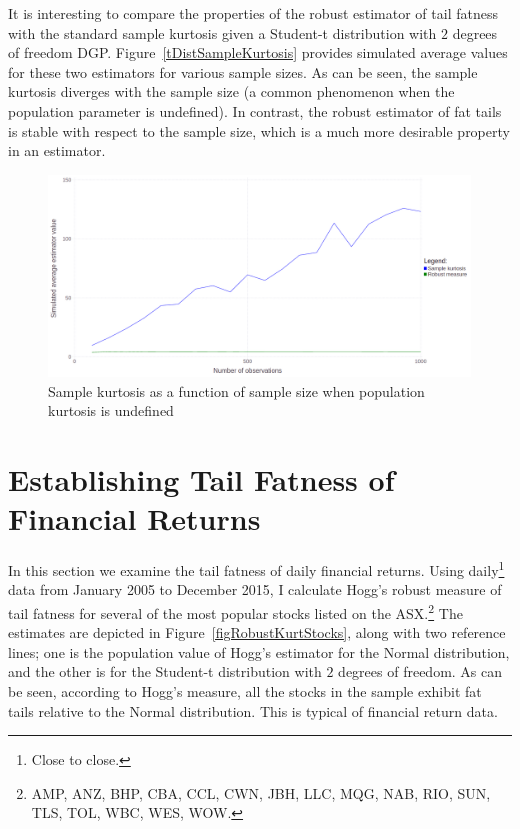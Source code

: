 \documentclass[12pt,a4paper]{amsart}
\begin{document}
It is interesting to compare the properties of the robust estimator of tail fatness with the standard sample kurtosis given a Student-t distribution with $2$ degrees of freedom DGP. Figure~\ref{tDistSampleKurtosis} provides simulated average values for these two estimators for various sample sizes. As can be seen, the sample kurtosis diverges with the sample size (a common phenomenon when the population parameter is undefined). In contrast, the robust estimator of fat tails is stable with respect to the sample size, which is a much more desirable property in an estimator.

\begin{figure}[htbp]
\centering
\includegraphics[height=5.35cm]{tDistSampleKurtosis.png}
\caption{\footnotesize{Sample kurtosis as a function of sample size when population kurtosis is undefined}}
\label{figtDistSampleKurtosis}
\end{figure}



\section{Establishing Tail Fatness of Financial Returns}\label{secFinReturnTailFatness}

In this section we examine the tail fatness of daily financial returns. Using daily\footnote{Close to close.} data from January 2005 to December 2015, I calculate Hogg's robust measure of tail fatness for several of the most popular stocks listed on the ASX.\footnote{AMP, ANZ, BHP, CBA, CCL, CWN, JBH, LLC, MQG, NAB, RIO, SUN, TLS, TOL, WBC, WES, WOW.} The estimates are depicted in Figure~\ref{figRobustKurtStocks}, along with two reference lines; one is the population value of Hogg's estimator for the Normal distribution, and the other is for the Student-t distribution with $2$ degrees of freedom. As can be seen, according to Hogg's measure, all the stocks in the sample exhibit fat tails relative to the Normal distribution. This is typical of financial return data.
\end{document}

